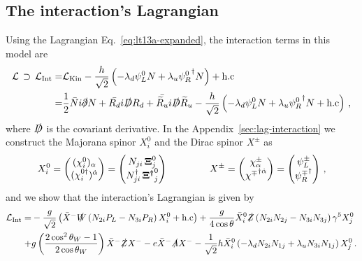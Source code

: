 \subsection{The interaction's Lagrangian}
%
Using the Lagrangian Eq.~\eqref{eq:lt13a-expanded}, the interaction terms in this model are
%
\begin{align}
\label{eq:lint1}
\mathcal{L} \, \supset \, \mathcal{L}_{\text{Int}}=&\mathcal{L}_{\text{Kin}}
- \dfrac{h}{\sqrt{2}}\left(-\lambda_d\psi_L^0N + \lambda_u{\psi_R^0}^{\dagger}N\right)+\text{h.c}\nonumber\\
= & \dfrac{1}{2}\bar{N}i\slashed{\partial}N + \bar{R_d}i\slashed{D}R_d + \bar{\widetilde{R}_u}i\slashed{D}\widetilde{R}_u
- \dfrac{h}{\sqrt{2}}\left(-\lambda_d\psi_L^0N + \lambda_u{\psi_R^0}^{\dagger}N+\text{h.c}\right)\,,
\end{align}
%
where $\slashed{D}$ is the covariant derivative. 
In the  Appendix~\ref{sec:lag-interaction}
we construct the Majorana spinor $X_i^0$ and the Dirac spinor $X^{\pm}$  as
\begin{align}
X_i^0=\begin{pmatrix}
(\chi_{i}^0)_\alpha \\ (\chi_i^{0\dagger})^{\dot{\alpha}}
\end{pmatrix}
=\begin{pmatrix}
N_{ji}\,\boldsymbol{\Xi}^{0}_j \\
N_{ji}^{\dagger}\,\boldsymbol{{\Xi}^{\dagger}}^{0}_j
\end{pmatrix}
\hspace{1.5 cm}
X^{\pm}=\begin{pmatrix}
\chi^{\pm}_{\alpha} \\ {\chi^{\mp}}^{\dagger\dot{\alpha}}
\end{pmatrix}
=\begin{pmatrix}
\psi_L^{\pm} \\
{\psi_R^{\mp}}^{\dagger}
\end{pmatrix}\,,
\end{align}
%
and we show that the interaction's Lagrangian is given by
%
\begin{align}
\label{eq:lint4}
\mathcal{L}_{\text{Int}}= & 
-\dfrac{g}{\sqrt{2}}\left(\bar{X}^-\slashed{W}\left(N_{2i}P_L-N_{3i}P_R\right)X_i^0 + \text{h.c}\right)
+ \dfrac{g}{4\cos\theta}\bar{X}_i^0\slashed{Z}\left(N_{2i}N_{2j}-N_{3i}N_{3j}\right)\gamma^5X_j^0 \nonumber\\
+& g\left(\dfrac{2\cos^2\theta_W-1}{2\cos\theta_W}\right)
\bar{X}^-\slashed{Z}X^-
-e\bar{X}^-\slashed{A}X^- 
-\dfrac{1}{\sqrt{2}}h\bar{X}_i^0\left(-\lambda_dN_{2i}N_{1j} + \lambda_uN_{3i}N_{1j}\right)X_j^0\,.
\end{align}
